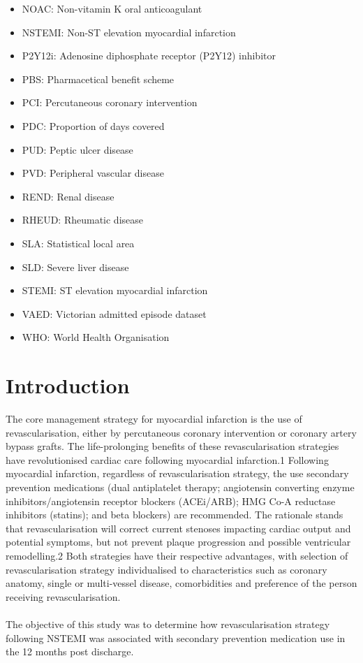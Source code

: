 \documentclass[11pt]{article}
\begin{document}
\begin{itemize}
\item NOAC: Non-vitamin K oral anticoagulant
\item NSTEMI: Non-ST elevation myocardial infarction
\item P2Y12i: Adenosine diphosphate receptor (P2Y12) inhibitor
\item PBS: Pharmacetical benefit scheme
\item PCI: Percutaneous coronary intervention
\item PDC: Proportion of days covered
\item PUD: Peptic ulcer disease
\item PVD: Peripheral vascular disease
\item REND: Renal disease
\item RHEUD: Rheumatic disease
\item SLA: Statistical local area
\item SLD: Severe liver disease
\item STEMI: ST elevation myocardial infarction
\item VAED: Victorian admitted episode dataset
\item WHO: World Health Organisation
\end{itemize}

\pagebreak

\section{Introduction}

The core management strategy for myocardial infarction is the use of revascularisation, either by percutaneous coronary intervention or coronary artery bypass grafts.\cite{accrevasc2022} The life-prolonging benefits of these revascularisation strategies have revolutionised cardiac care following myocardial infarction.1 Following myocardial infarction, regardless of revascularisation strategy, the use secondary prevention medications (dual antiplatelet therapy; angiotensin converting enzyme inhibitors/angiotensin receptor blockers (ACEi/ARB); HMG Co-A reductase inhibitors (statins); and beta blockers) are recommended. The rationale stands that revascularisation will correct current stenoses impacting cardiac output and potential symptoms, but not prevent plaque progression and possible ventricular remodelling.2 Both strategies have their respective advantages, with selection of revascularisation strategy individualised to characteristics such as coronary anatomy, single or multi-vessel disease, comorbidities and preference of the person receiving revascularisation.\cite{accrevasc2022} \\~\\
The objective of this study was to determine how revascularisation strategy following NSTEMI was associated with secondary prevention medication use in the 12 months post discharge.  
\end{document}
